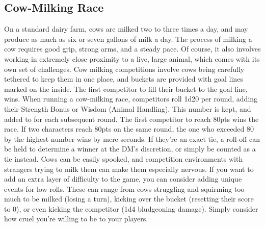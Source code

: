 \documentclass[10pt,a4paper,twoside,bg=print,twocolumn,openany,nodeprecatedcode]{dndbook}
\begin{document}
\subsection{Cow-Milking Race}
On a standard dairy farm, cows are milked two to three times a day, and may produce as much as six or seven gallons of milk a day. The process of milking a cow requires good grip, strong arms, and a steady pace. Of course, it also involves working in extremely close proximity to a live, large animal, which comes with its own set of challenges. Cow milking competitions involve cows being carefully tethered to keep them in one place, and buckets are provided with goal lines marked on the inside. The first competitor to fill their bucket to the goal line, wins.
When running a cow-milking race, competitors roll 1d20 per round, adding their Strength Bonus or Wisdom (Animal Handling). This number is kept, and added to for each subsequent round. The first competitor to reach 80pts wins the race. If two characters reach 80pts on the same round, the one who exceeded 80 by the highest number wins by mere seconds. If they're an exact tie, a roll-off can be held to determine a winner at the DM's discretion, or simply be counted as a tie instead.
Cows can be easily spooked, and competition environments with strangers trying to milk them can make them especially nervous. If you want to add an extra layer of difficulty to the game, you can consider adding unique events for low rolls. These can range from cows struggling and squirming too much to be milked (losing a turn), kicking over the bucket (resetting their score to 0), or even kicking the competitor (1d4 bludgeoning damage). Simply consider how cruel you're willing to be to your players.
\end{document}
